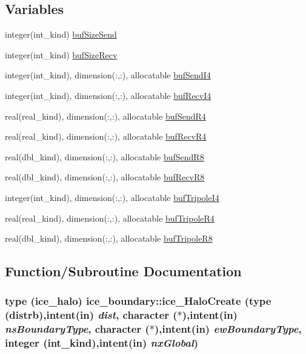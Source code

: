 \subsection*{Variables}
\begin{DoxyCompactItemize}
\item 
integer(int\_\-kind) \hyperlink{namespaceice__boundary_aa836a7146cb8129f59f4a457b5100c2c}{bufSizeSend}
\item 
integer(int\_\-kind) \hyperlink{namespaceice__boundary_a4faa8fff704b4598309e0cdb8a777032}{bufSizeRecv}
\item 
integer(int\_\-kind), dimension(:,:), allocatable \hyperlink{namespaceice__boundary_a2554f422dd4f1b67e0affadd17f11069}{bufSendI4}
\item 
integer(int\_\-kind), dimension(:,:), allocatable \hyperlink{namespaceice__boundary_a59b118d50a3fe964e4109999b54f432b}{bufRecvI4}
\item 
real(real\_\-kind), dimension(:,:), allocatable \hyperlink{namespaceice__boundary_a78f43d9e66420f40a9140762b7b69427}{bufSendR4}
\item 
real(real\_\-kind), dimension(:,:), allocatable \hyperlink{namespaceice__boundary_a9924032ec4c94a255c40c319d1577a08}{bufRecvR4}
\item 
real(dbl\_\-kind), dimension(:,:), allocatable \hyperlink{namespaceice__boundary_a6fd3fc7d61b1eb43afbd050a0d073c90}{bufSendR8}
\item 
real(dbl\_\-kind), dimension(:,:), allocatable \hyperlink{namespaceice__boundary_a8322278cdca5c48f9a5bad7118fcbecd}{bufRecvR8}
\item 
integer(int\_\-kind), dimension(:,:), allocatable \hyperlink{namespaceice__boundary_a3bcbb0d2bf24f90a72bbbedfd53ec6bd}{bufTripoleI4}
\item 
real(real\_\-kind), dimension(:,:), allocatable \hyperlink{namespaceice__boundary_a8d42883469648c0eef77bb2f2c830853}{bufTripoleR4}
\item 
real(dbl\_\-kind), dimension(:,:), allocatable \hyperlink{namespaceice__boundary_a0cf3692aba462080bcd506c8e2b56b21}{bufTripoleR8}
\end{DoxyCompactItemize}


\subsection{Function/Subroutine Documentation}
\hypertarget{namespaceice__boundary_a75ebd3c57772fed459b69767634757d0}{
\subsubsection[{ice\_\-HaloCreate}]{\setlength{\rightskip}{0pt plus 5cm}type ({\bf ice\_\-halo}) ice\_\-boundary::ice\_\-HaloCreate (type ({\bf distrb}),intent(in) {\em dist}, \/  character ($\ast$),intent(in) {\em nsBoundaryType}, \/  character ($\ast$),intent(in) {\em ewBoundaryType}, \/  integer (int\_\-kind),intent(in) {\em nxGlobal})}}
\label{namespaceice__boundary_a75ebd3c57772fed459b69767634757d0}


